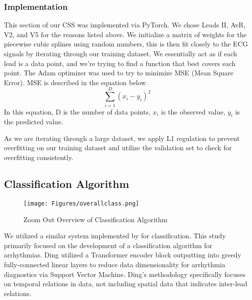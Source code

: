 \documentclass[
	a4paper, 
	10pt, 
	twoside, 
]{LTJournalArticle}
\begin{document}
\subsubsection{Implementation}
This section of our CSS was implemented via PyTorch. We chose Leads II, AvR, V2, and V5 for the reasons listed above. We initialize a matrix of weights for the piecewise cubic splines using random numbers, this is then fit closely to the ECG signals by iterating through our training dataset. We essentially act as if each lead is a data point, and we're trying to find a function that best covers each point. The Adam optimizer was used to try to minimize MSE (Mean Square Error). MSE is described in the equation below. 
\begin{equation}
    \sum_{i=1}^{D}(x_i-y_i)^2
\end{equation}
In this equation, D is the number of data points, $x_i$ is the observed value, $y_i$ is the predicted value. 

As we are iterating through a large dataset, we apply L1 regulation to prevent overfitting on our training dataset and utilize the validation set to check for overfitting consistently. 

\subsection{Classification Algorithm}
\begin{figure}[!hbtp]
    \centering
    \texttt{[image: Figures/overallclass.png]}
    \caption{Zoom Out Overview of Classification Algorithm}
    \label{fig:overallclass}
\end{figure}
We utilized a similar system implemented by \textcite{Ding2023} for classification. This study primarily focused on the development of a classification algorithm for arrhythmias. Ding utilized a Transformer encoder block outputting into greedy fully-connected linear layers to reduce data dimensionality for arrhythmia diagnostics via Support Vector Machine. Ding's methodology specifically focuses on temporal relations in data, not including spatial data that indicates inter-lead relations. 
\end{document}
